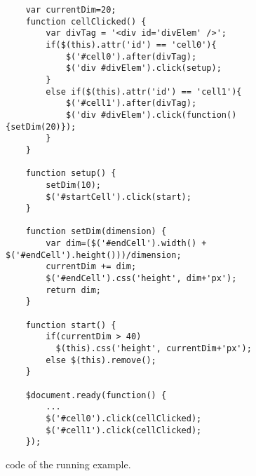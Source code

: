 \begin{figure}
\begin{lstlisting}
	var currentDim=20;
	function cellClicked() {	
		var divTag = '<div id='divElem' />';
		if($(this).attr('id') == 'cell0'){
			$('#cell0').after(divTag);
			$('div #divElem').click(setup);
		}
		else if($(this).attr('id') == 'cell1'){
			$('#cell1').after(divTag);
			$('div #divElem').click(function(){setDim(20)});
		}
	}
			 			
	function setup() {
		setDim(10);
		$('#startCell').click(start);
	}
	
	function setDim(dimension) {
		var dim=($('#endCell').width() + $('#endCell').height()))/dimension;
		currentDim += dim;
		$('#endCell').css('height', dim+'px');
		return dim;
	}
	
	function start() {
		if(currentDim > 40)
		  $(this).css('height', currentDim+'px');
		else $(this).remove(); 
	}
	
	$document.ready(function() {
		...
		$('#cell0').click(cellClicked);	
		$('#cell1').click(cellClicked);	
	});
\end{lstlisting}
\vspace{-0.1in} 

\caption{\javascript code of the running example.}
\label{Fig:funcCovgExample}
\vspace{-0.1in} 

\end{figure}
